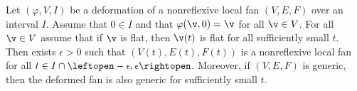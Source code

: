 \begin{lemma}[]\label{lemma:fan-open}
Let $(\varphi,V,I)$ be a deformation of a nonreflexive local fan $(V,E,F)$ over an
interval $I$.  Assume that $0\in I$ and that $\varphi(\v,0)=\v$ for
all $\v\in V$.  For all $\v\in V$ assume that if
$\v$ is flat, then $\v(t)$ is flat for all sufficiently small $t$.
Then exists $\epsilon>0$ such that $(V(t),E(t),F(t))$ is a nonreflexive local fan
for all $t\in I\cap \leftopen-\epsilon,\epsilon\rightopen$.  
Moreover,  if $(V,E,F)$ is
generic, then the deformed fan is also generic for sufficiently small
$t$.
\end{lemma}

